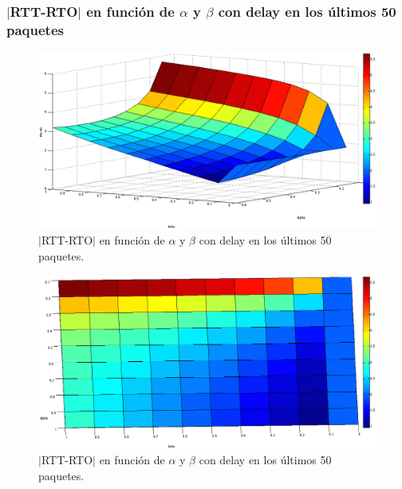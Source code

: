 \documentclass[10pt, a4paper]{article}
\begin{document}
\subsubsection{$|$RTT-RTO$|$ en función de $\alpha$ y $\beta$ con delay en los últimos 50 paquetes}
\begin{figure}[H]
\begin{center}
\includegraphics[width=17cm]{delay-50L.png}
\caption{$|$RTT-RTO$|$ en función de $\alpha$ y $\beta$ con delay en los últimos 50 paquetes.}
\end{center}
\end{figure}

\begin{figure}[H]
\begin{center}
\includegraphics[width=17cm]{delay-50L-costado.png}
\caption{$|$RTT-RTO$|$ en función de $\alpha$ y $\beta$ con delay en los últimos 50 paquetes.}
\end{center}
\end{figure}
\end{document}
